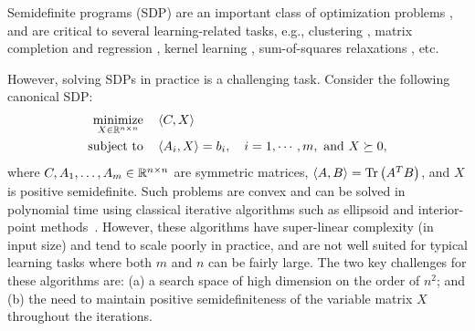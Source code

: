 
Semidefinite programs (SDP) are an important class of optimization problems \citep{vandenberghe1996semidefinite}, and are critical to several learning-related tasks, e.g., clustering \citep{shi2000normalized,abbe2017community}, matrix completion and regression \citep{recht2010guaranteed,candes2009exact}, kernel learning \citep{lanckriet2004learning}, sum-of-squares relaxations \citep{barak2015dictionary}, etc. 

However, solving SDPs in practice is a challenging task. Consider the following  canonical SDP: 
\begin{align}
\underset{X \in \mathbb{R}^{n \times n}}{\operatorname*{\mathrm{minimize}}} \quad & \left\langle C, X \right\rangle \nonumber \\
\text{subject to} \quad & \left\langle A_i, X \right\rangle =b_i,\quad i =1,\cdots, m, \text{ and } X \succeq 0,
\label{eq:sdp}
\end{align}
where $C, A_1, \ldots, A_m \in \mathbb{R}^{n\times n}$ are symmetric matrices, $\left\langle A, B \right\rangle = \mathrm{Tr}\left(A^T B\right)$, and $X$ is positive semidefinite. Such problems are convex and can be solved in polynomial time using classical iterative algorithms such as ellipsoid and interior-point methods~\citep{nesterov1994interior}.  However, these algorithms have super-linear complexity (in input size) and tend to scale poorly in practice, and are not well suited for typical learning tasks where both $m$ and $n$ can be fairly large. The two key challenges for these algorithms are: (a) a search space of high dimension on the order of $n^2$; and (b) the need to maintain positive semidefiniteness of the variable matrix $X$ throughout the iterations. 

%
%


